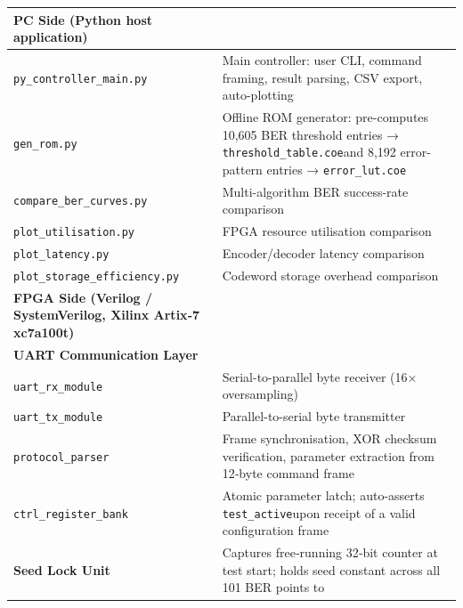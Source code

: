 \documentclass[
  12pt,
  a4paper]{report}
\newcounter{none} %
\begin{document}
{\def\LTcaptype{none} %
\begin{longtable}[]{@{}
  >{\raggedright\arraybackslash}p{}
  >{\raggedright\arraybackslash}p{}@{}}
\toprule\noalign{}
\begin{minipage}[b]{\linewidth}\raggedright
\textbf{PC Side (Python host application)}\hspace{0pt}
\end{minipage} & \begin{minipage}[b]{\linewidth}\raggedright
\end{minipage} \\
\midrule\noalign{}
\endhead
\bottomrule\noalign{}
\endlastfoot
\texttt{py\_controller\_main.py} & Main controller: user CLI, command
framing, result parsing, CSV export, auto-plotting \\
\texttt{gen\_rom.py} & Offline ROM generator: pre-computes 10,605 BER
threshold entries → \texttt{threshold\_table.coe}and 8,192 error-pattern
entries → \texttt{error\_lut.coe} \\
\texttt{compare\_ber\_curves.py} & Multi-algorithm BER success-rate
comparison \\
\texttt{plot\_utilisation.py} & FPGA resource utilisation comparison \\
\texttt{plot\_latency.py} & Encoder/decoder latency comparison \\
\texttt{plot\_storage\_efficiency.py} & Codeword storage overhead
comparison \\
\textbf{FPGA Side (Verilog / SystemVerilog, Xilinx Artix‑7
xc7a100t)}\hspace{0pt} & \\
\textbf{UART Communication Layer}\hspace{0pt} & \\
\texttt{uart\_rx\_module} & Serial-to-parallel byte receiver (16×
oversampling) \\
\texttt{uart\_tx\_module} & Parallel-to-serial byte transmitter \\
\texttt{protocol\_parser} & Frame synchronisation, XOR checksum
verification, parameter extraction from 12‑byte command frame \\
\texttt{ctrl\_register\_bank} & Atomic parameter latch; auto-asserts
\texttt{test\_active}upon receipt of a valid configuration frame \\
\textbf{Seed Lock Unit}\hspace{0pt} & Captures free‑running 32‑bit
counter at test start; holds seed constant across all 101 BER points to

\end{longtable}}
\end{document}
